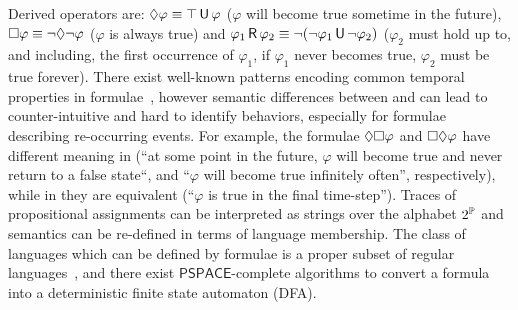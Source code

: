 Derived operators are: $\Diamond \varphi \equiv \top \,\mathsf{U}\, \varphi$ ($\varphi$ will become true sometime in the future), $\Box\varphi \equiv \neg \Diamond \neg \varphi$ ($\varphi$ is always true) and $\varphi_1 \,\mathsf{R}\, \varphi_2 \equiv \neg (\neg \varphi_1 \,\mathsf{U}\, \neg \varphi_2)$ ($\varphi_2$ must hold up to, and including, the first occurrence of $\varphi_1$, if $\varphi_1$ never becomes true, $\varphi_2$ must be true forever).
There exist well-known patterns encoding common temporal properties in \LTL formulae~\cite{dwyer1998property}, however semantic differences between \LTL and \LTLf can lead to counter-intuitive and hard to identify behaviors, especially for formulae describing re-occurring events.
For example, the formulae $\Diamond\Box \varphi$ and $\Box\Diamond \varphi$ have different meaning in \LTL (``at some point in the future, $\varphi$ will become true and never return to a false state``, and ``$\varphi$ will become true infinitely often'', respectively), while in \LTLf they are equivalent (``$\varphi$ is true in the final time-step'').
%
Traces of propositional assignments can be interpreted as strings over the alphabet $2^{\mathbb{P}}$ and \LTLf semantics can be re-defined in terms of language membership. The class of languages which can be defined by \LTLf formulae is a proper subset of regular languages~\cite{de2013linear}, and there exist $\mathsf{PSPACE}$-complete algorithms to convert a formula into a deterministic finite state automaton (DFA). %
